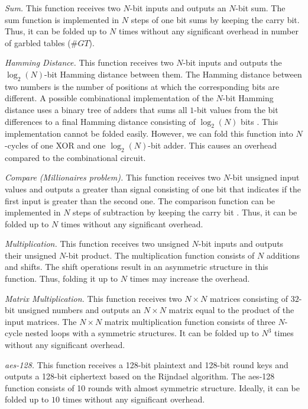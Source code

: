 \textit{Sum.} This function receives two $N$-bit inputs and outputs an $N$-bit sum.
The sum function is implemented in $N$ steps of one bit sums by keeping the carry bit.
Thus, it can be folded up to $N$ times without any significant overhead in number of garbled tables ($\mathit{\#GT}$).

\textit{Hamming Distance.} This function receives two $N$-bit inputs and outputs the $\log_2(N)$-bit Hamming distance between them.
The Hamming distance between two numbers is the number of positions at which the corresponding bits are different.
A possible combinational implementation of the $N$-bit Hamming distance uses a binary tree of adders that sums all $1$-bit values from the bit differences to a final Hamming distance consisting of $\log_2(N)$ bits \cite{boyar2006concrete}.
This implementation cannot be folded easily.
However, we can fold this function into $N$-cycles of one XOR and one $\log_2(N)$-bit adder.
This causes an overhead compared to the combinational circuit.

\textit{Compare (Millionaires problem).} This function receives two $N$-bit unsigned input values and outputs a greater than signal consisting of one bit that indicates if the first input is greater than the second one.
The comparison function can be implemented in $N$ steps of subtraction by keeping the carry bit \cite{kolesnikov2009improved}.
Thus, it can be folded up to $N$ times without any significant overhead.

\textit{Multiplication.} This function receives two unsigned $N$-bit inputs and outputs their unsigned $N$-bit product.
The multiplication function consists of $N$ additions and shifts.
The shift operations result in an asymmetric structure in this function.
Thus, folding it up to $N$ times may increase the overhead.

\textit{Matrix Multiplication.} This function receives two $N\times N$ matrices consisting of $32$-bit unsigned numbers and outputs an $N\times N$ matrix equal to the product of the input matrices.
The $N\times N$ matrix multiplication function consists of three $N$-cycle nested loops with a symmetric structures.
It can be folded up to $N^3$ times without any significant overhead.

\textit{\acrshort{aes}-128.} This function receives a 128-bit plaintext and 128-bit round keys and outputs a 128-bit ciphertext based on the Rijndael algorithm.
The \acrshort{aes}-128 function consists of 10 rounds with almost symmetric structure.
Ideally, it can be folded up to $10$ times without any significant overhead.


